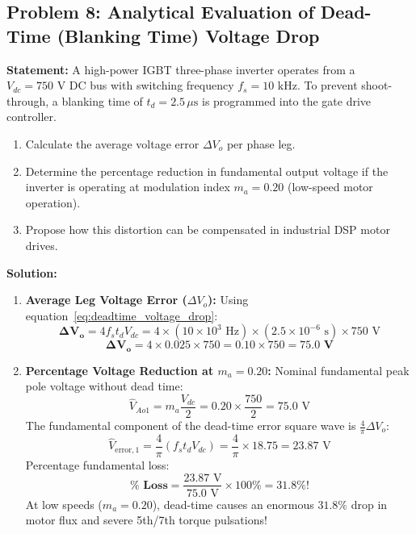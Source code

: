\documentclass[11pt,a4paper]{article}
\begin{document}
\subsection{Problem 8: Analytical Evaluation of Dead-Time (Blanking Time) Voltage Drop}
\begin{examplebox}
\textbf{Statement:} A high-power IGBT three-phase inverter operates from a $V_{dc} = 750\text{ V}$ DC bus with switching frequency $f_s = 10\text{ kHz}$. To prevent shoot-through, a blanking time of $t_d = 2.5\,\mu\text{s}$ is programmed into the gate drive controller.
\begin{enumerate}
  \item Calculate the average voltage error $\Delta V_o$ per phase leg.
  \item Determine the percentage reduction in fundamental output voltage if the inverter is operating at modulation index $m_a = 0.20$ (low-speed motor operation).
  \item Propose how this distortion can be compensated in industrial DSP motor drives.
\end{enumerate}

\tcblower
\textbf{Solution:}
\begin{enumerate}
  \item \textbf{Average Leg Voltage Error ($\Delta V_o$):}
  Using equation~\eqref{eq:deadtime_voltage_drop}:
  \begin{equation*}
  \mathbf{\Delta V_o} = 4 f_s t_d V_{dc} = 4 \times (10 \times 10^3\text{ Hz}) \times (2.5 \times 10^{-6}\text{ s}) \times 750\text{ V}
  \end{equation*}
  \begin{equation*}
  \mathbf{\Delta V_o} = 4 \times 0.025 \times 750 = 0.10 \times 750 = \mathbf{75.0\text{ V}}
  \end{equation*}

  \item \textbf{Percentage Voltage Reduction at $m_a = 0.20$:}
  Nominal fundamental peak pole voltage without dead time:
  \begin{equation*}
  \hat{V}_{Ao1} = m_a \frac{V_{dc}}{2} = 0.20 \times \frac{750}{2} = 75.0\text{ V}
  \end{equation*}
  The fundamental component of the dead-time error square wave is $\frac{4}{\pi}\Delta V_o$:
  \begin{equation*}
  \hat{V}_{\text{error},1} = \frac{4}{\pi} (f_s t_d V_{dc}) = \frac{4}{\pi} \times 18.75 = 23.87\text{ V}
  \end{equation*}
  Percentage fundamental loss:
  \begin{equation*}
  \mathbf{\% \text{ Loss}} = \frac{23.87\text{ V}}{75.0\text{ V}} \times 100\% = \mathbf{31.8\%!}
  \end{equation*}
  At low speeds ($m_a = 0.20$), dead-time causes an enormous $31.8\%$ drop in motor flux and severe 5th/7th torque pulsations!


\end{enumerate}
\end{examplebox}
\end{document}
